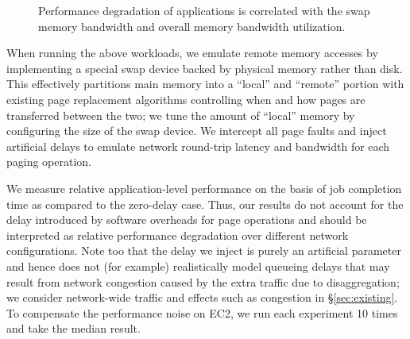 %
\begin{figure}[t]
    \centering
    \caption{\small{Performance degradation of applications is correlated with the swap memory bandwidth and overall memory bandwidth utilization.}}
    \label{fig:bandwidths11}
\end{figure}
%

When running the above workloads, we emulate remote memory accesses by implementing a special swap device backed by physical memory rather than disk. 
This effectively partitions main memory into a ``local'' and ``remote'' portion with existing page replacement algorithms controlling when and how pages are transferred between the two; we tune the amount of ``local'' memory by configuring the size of the swap device.
We intercept all page faults and inject artificial delays to emulate network round-trip latency and bandwidth for each paging operation. 

We measure relative application-level performance on the basis of job completion time as compared to the zero-delay case. Thus, our results do not account for the delay introduced by  software overheads for page operations 
and should be interpreted as relative performance degradation over different network configurations. %
Note too that the delay we inject is purely an artificial parameter and hence does not (for example) realistically model queueing delays that may result from network congestion caused by the extra traffic due to disaggregation; we consider network-wide traffic and effects such as congestion in \S\ref{sec:existing}.
To compensate the performance noise on EC2, we run each experiment 10 times and take the median result.

